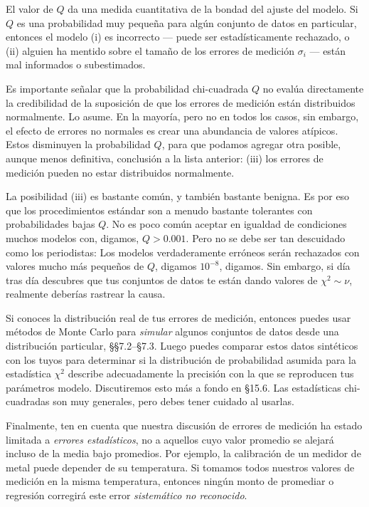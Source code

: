 \documentclass[10pt,a4paper]{book}
\begin{document}
El valor de $Q$ da una medida cuantitativa de la bondad del ajuste del modelo. Si $Q$ es una probabilidad muy pequeña para algún conjunto de datos en particular, entonces el modelo (i) es incorrecto --- puede ser estadísticamente rechazado, o (ii) alguien ha mentido sobre el tamaño de los errores de medición $\sigma_i$ --- están mal informados o subestimados.

Es importante señalar que la probabilidad chi-cuadrada $Q$ no evalúa directamente la credibilidad de la suposición de que los errores de medición están distribuidos normalmente. Lo asume. En la mayoría, pero no en todos los casos, sin embargo, el efecto de errores no normales es crear una abundancia de valores atípicos. Estos disminuyen la probabilidad $Q$, para que podamos agregar otra posible, aunque menos definitiva, conclusión a la lista anterior: (iii) los errores de medición pueden no estar distribuidos normalmente.

La posibilidad (iii) es bastante común, y también bastante benigna. Es por eso que los procedimientos estándar son a menudo bastante tolerantes con probabilidades bajas $Q$. No es poco común aceptar en igualdad de condiciones muchos modelos con, digamos, $Q > 0.001$. Pero no se debe ser tan descuidado como los periodistas: Los modelos verdaderamente erróneos serán rechazados con valores mucho más pequeños de $Q$, digamos $10^{-8}$, digamos. Sin embargo, si día tras día descubres que tus conjuntos de datos te están dando valores de $\chi^2 \sim \nu$, realmente deberías rastrear la causa.

Si conoces la distribución real de tus errores de medición, entonces puedes usar métodos de Monte Carlo para \textit{simular} algunos conjuntos de datos desde una distribución particular, §§7.2--§7.3. Luego puedes comparar estos datos sintéticos con los tuyos para determinar si la distribución de probabilidad asumida para la estadística $\chi^2$ describe adecuadamente la precisión con la que se reproducen tus parámetros modelo. Discutiremos esto más a fondo en §15.6. Las estadísticas chi-cuadradas son muy generales, pero debes tener cuidado al usarlas.

Finalmente, ten en cuenta que nuestra discusión de errores de medición ha estado limitada a \textit{errores estadísticos}, no a aquellos cuyo valor promedio se alejará incluso de la media bajo promedios. Por ejemplo, la calibración de un medidor de metal puede depender de su temperatura. Si tomamos todos nuestros valores de medición en la misma temperatura, entonces ningún monto de promediar o regresión corregirá este error \textit{sistemático no reconocido}.
\end{document}
